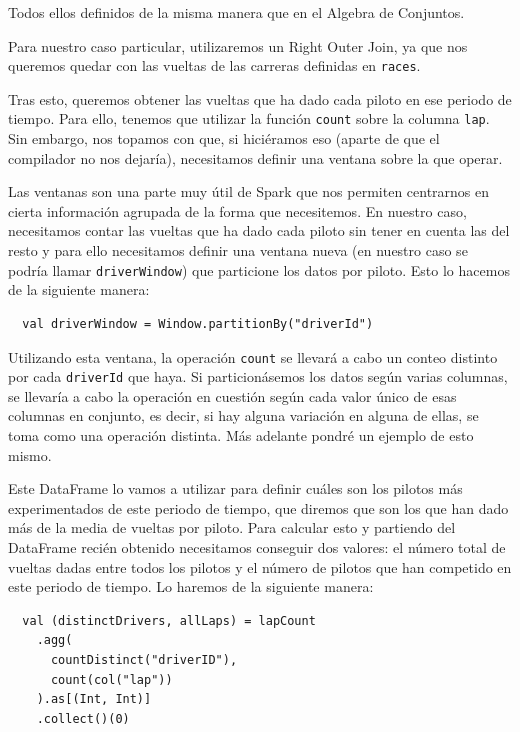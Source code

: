 \documentclass[12pt,twoside,titlepage]{report}
\begin{document}
Todos ellos definidos de la misma manera que en el Algebra de Conjuntos.

Para nuestro caso particular, utilizaremos un Right Outer Join, ya que nos queremos quedar con las vueltas de las carreras definidas en \texttt{races}.

Tras esto, queremos obtener las vueltas que ha dado cada piloto en ese periodo de tiempo. Para ello, tenemos que utilizar la función \texttt{count} sobre la columna \texttt{lap}. Sin embargo, nos topamos con que, si hiciéramos eso (aparte de que el compilador no nos dejaría), necesitamos definir una ventana sobre la que operar.

Las ventanas son una parte muy útil de Spark que nos permiten centrarnos en cierta información agrupada de la forma que necesitemos. En nuestro caso, necesitamos contar las vueltas que ha dado cada piloto sin tener en cuenta las del resto y para ello necesitamos definir una ventana nueva (en nuestro caso se podría llamar \texttt{driverWindow}) que particione los datos por piloto. Esto lo hacemos de la siguiente manera:

\begin{lstlisting}
  val driverWindow = Window.partitionBy("driverId") 
\end{lstlisting}

Utilizando esta ventana, la operación \texttt{count} se llevará a cabo un conteo distinto por cada \texttt{driverId} que haya. Si particionásemos los datos según varias columnas, se llevaría a cabo la operación en cuestión según cada valor único de esas columnas en conjunto, es decir, si hay alguna variación en alguna de ellas, se toma como una operación distinta. Más adelante pondré un ejemplo de esto mismo.

Este DataFrame lo vamos a utilizar para definir cuáles son los pilotos más experimentados de este periodo de tiempo, que diremos que son los que han dado más de la media de vueltas por piloto. Para calcular esto y partiendo del DataFrame recién obtenido necesitamos conseguir dos valores: el número total de vueltas dadas entre todos los pilotos y el número de pilotos que han competido en este periodo de tiempo. Lo haremos de la siguiente manera:

\begin{lstlisting}
  val (distinctDrivers, allLaps) = lapCount
    .agg(
      countDistinct("driverID"),
      count(col("lap"))
    ).as[(Int, Int)]
    .collect()(0)
\end{lstlisting}
\end{document}
